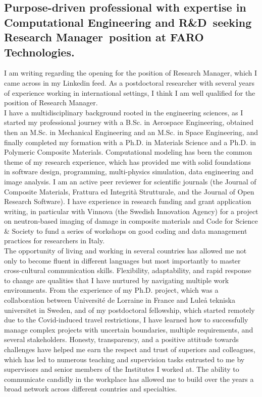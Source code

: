 \documentclass[
  a4paper, 
]{fortysecondscv}
\def\expertise{Computational Engineering and R\&D}
\def\position{Research Manager}
\def\company{FARO Technologies}
\def\jobsource{my Linkedin feed}
\def\salutation{Luzia}
\begin{document}
\makefrontsidebar

\cvsignature
\vspace*{12pt}
\subsection{\textbf{Purpose-driven professional with expertise in \expertise\ seeking \position\ position at \company.}}
\vspace*{12pt}
I am writing regarding the opening for the position of \position, which I came across in \jobsource. As a postdoctoral researcher with several years of experience working in international settings, I think I am well qualified for the position of \position.\\[8pt]
I have a multidisciplinary background rooted in the engineering sciences, as I started my professional journey with a B.Sc. in Aerospace Engineering, obtained then an M.Sc. in Mechanical Engineering and an M.Sc. in Space Engineering, and finally completed my formation with a Ph.D. in Materials Science and a Ph.D. in Polymeric Composite Materials. Computational modeling has been the common theme of my research experience, which has provided me with solid foundations in software design, programming, multi-physics simulation, data engineering and image analysis. I am an active peer reviewer for scientific journals (the Journal of Composite Materials, Frattura ed Integrità Strutturale, and the Journal of Open Research Software). I have experience in research funding and grant application writing, in particular with Vinnova (the Swedish Innovation Agency) for a project on neutron-based imaging of damage in composite materials and Code for Science \& Society to fund a series of workshops on good coding and data management practices for researchers in Italy.\\[8pt]
The opportunity of living and working in several countries has allowed me not only to become fluent in different languages but most importantly to master cross-cultural communication skills. Flexibility, adaptability, and rapid response to change are qualities that I have nurtured by navigating multiple work environments. From the experience of my Ph.D. project, which was a collaboration between Universit{\'e} de Lorraine in France and Lule{\aa} tekniska universitet in Sweden, and of my postdoctoral fellowship, which started remotely due to the Covid-induced travel restrictions, I have learned how to successfully manage complex projects with uncertain boundaries, multiple requirements, and several stakeholders. Honesty, transparency, and a positive attitude towards challenges have helped me earn the respect and trust of superiors and colleagues, which has led to numerous teaching and supervision tasks entrusted to me by supervisors and senior members of the Institutes I worked at. The ability to communicate candidly in the workplace has allowed me to build over the years a broad network across different countries and specialties.\\[8pt]
\end{document}

